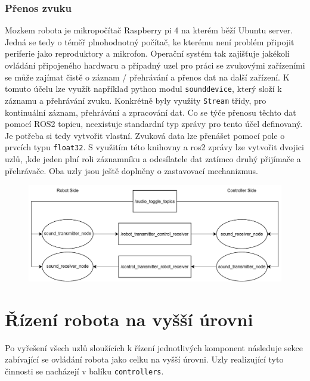 \subsubsection*{Přenos zvuku}
Mozkem robota je mikropočítač Raspberry pi 4 na kterém běží Ubuntu server. Jedná se tedy o téměř plnohodnotný počítač, ke kterému není problém připojit periferie jako reproduktory a mikrofon. Operační systém tak zajišťuje jakékoli ovládání připojeného hardwaru a případný uzel pro práci se zvukovými zařízeními se může zajímat čistě o záznam / přehrávání a přenos dat na další zařízení. K tomuto účelu lze využít například python modul \verb|sounddevice|, který složí k záznamu a přehrávání zvuku. Konkrétně byly využity \verb|Stream| třídy, pro kontinuální záznam, přehrávání a zpracování dat. Co se týče přenosu těchto dat pomocí ROS2 topicu, neexistuje standardní typ zprávy pro tento účel definovaný. Je potřeba si tedy vytvořit vlastní. Zvuková data lze přenášet pomocí pole o prvcích typu \verb|float32|. S využitím této knihovny a ros2 zprávy lze vytvořit dvojici uzlů, ,kde jeden plní roli záznamníku a odesílatele dat zatímco druhý přijímače a přehrávače. Oba uzly jsou ještě doplněny o zastavovací mechanizmus.

\begin{figure}[h!]
	\centering
	\includegraphics[scale=0.75]{obrazky-figures/audio_transfer_diagram.pdf}
	\caption{}
	\label{}
\end{figure}

\section{Řízení robota na vyšší úrovni}
Po vyřešení všech uzlů sloužících k řízení jednotlivých komponent následuje sekce zabívající se ovládání robota jako celku na vyšší úrovni. Uzly realizující tyto činnosti se nacházejí v balíku \verb|controllers|. 

